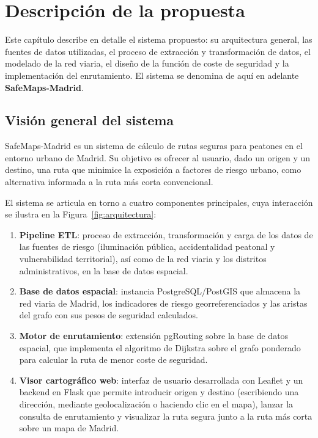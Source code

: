 \chapter{Descripción de la propuesta}
\label{cap:propuesta}

Este capítulo describe en detalle el sistema propuesto: su arquitectura general, las fuentes de datos utilizadas, el proceso de extracción y transformación de datos, el modelado de la red viaria, el diseño de la función de coste de seguridad y la implementación del enrutamiento. El sistema se denomina de aquí en adelante \textbf{SafeMaps-Madrid}.

\section{Visión general del sistema}
\label{sec:vision_general}

SafeMaps-Madrid es un sistema de cálculo de rutas seguras para peatones en el entorno urbano de Madrid. Su objetivo es ofrecer al usuario, dado un origen y un destino, una ruta que minimice la exposición a factores de riesgo urbano, como alternativa informada a la ruta más corta convencional.

El sistema se articula en torno a cuatro componentes principales, cuya interacción se ilustra en la Figura~\ref{fig:arquitectura}:

\begin{enumerate}
    \item \textbf{Pipeline ETL}: proceso de extracción, transformación y carga de los datos de las fuentes de riesgo (iluminación pública, accidentalidad peatonal y vulnerabilidad territorial), así como de la red viaria y los distritos administrativos, en la base de datos espacial.
    \item \textbf{Base de datos espacial}: instancia PostgreSQL/PostGIS que almacena la red viaria de Madrid, los indicadores de riesgo georreferenciados y las aristas del grafo con sus pesos de seguridad calculados.
    \item \textbf{Motor de enrutamiento}: extensión pgRouting sobre la base de datos espacial, que implementa el algoritmo de Dijkstra sobre el grafo ponderado para calcular la ruta de menor coste de seguridad.
    \item \textbf{Visor cartográfico web}: interfaz de usuario desarrollada con Leaflet y un backend en Flask que permite introducir origen y destino (escribiendo una dirección, mediante geolocalización o haciendo clic en el mapa), lanzar la consulta de enrutamiento y visualizar la ruta segura junto a la ruta más corta sobre un mapa de Madrid.
\end{enumerate}

